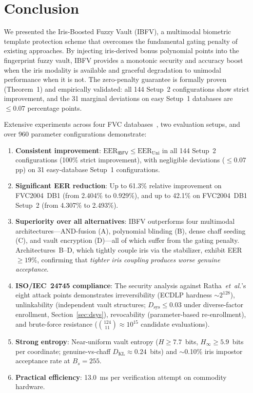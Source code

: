 \documentclass[3p,twocolumn]{elsarticle}
\newcommand{\IBFV}{\textsf{IBFV}}
\newcommand{\EER}{\mathrm{EER}}
\begin{document}
\section{Conclusion}
\label{sec:conclusion}

We presented the Iris-Boosted Fuzzy Vault (\IBFV{}), a multimodal biometric template protection scheme that overcomes the fundamental gating penalty of existing approaches. By injecting iris-derived bonus polynomial points into the fingerprint fuzzy vault, \IBFV{} provides a monotonic security and accuracy boost when the iris modality is available and graceful degradation to unimodal performance when it is not. The zero-penalty guarantee is formally proven (Theorem~1) and empirically validated: all 144 Setup~2 configurations show strict improvement, and the 31 marginal deviations on easy Setup~1 databases are $\leq 0.07$ percentage points.

Extensive experiments across four FVC databases~\cite{maio2002fvc2002,maio2004fvc2004}, two evaluation setups, and over 960 parameter configurations demonstrate:
\begin{enumerate}
    \item \textbf{Consistent improvement}: $\EER_{\IBFV} \leq \EER_{\text{Uni}}$ in all 144 Setup~2 configurations (100\% strict improvement), with negligible deviations ($\leq 0.07$ pp) on 31 easy-database Setup~1 configurations.
    \item \textbf{Significant EER reduction}: Up to 61.3\% relative improvement on FVC2004~DB1 (from 2.404\% to 0.929\%), and up to 42.1\% on FVC2004~DB1 Setup~2 (from 4.307\% to 2.493\%).
    \item \textbf{Superiority over all alternatives}: \IBFV{} outperforms four multimodal architectures---AND-fusion (A), polynomial blinding (B), dense chaff seeding (C), and vault encryption (D)---all of which suffer from the gating penalty. Architectures~B--D, which tightly couple iris via the stabilizer, exhibit EER $\geq 19\%$, confirming that \emph{tighter iris coupling produces worse genuine acceptance}.
    \item \textbf{ISO/IEC~24745 compliance}: The security analysis against Ratha~\textit{et~al.}'s~\cite{ratha2001enhancing} eight attack points demonstrates irreversibility (ECDLP hardness $\sim\!2^{128}$), unlinkability (independent vault structures; $D_{\text{sys}} \leq 0.03$ under diverse-factor enrollment, Section~\ref{sec:dsys}), revocability (parameter-based re-enrollment), and brute-force resistance ($\binom{124}{11} \approx 10^{15}$ candidate evaluations).
    \item \textbf{Strong entropy}: Near-uniform vault entropy ($H \geq 7.7$~bits, $H_\infty \geq 5.9$~bits per coordinate; genuine-vs-chaff $D_{\mathrm{KL}} \approx 0.24$~bits) and $\sim$0.10\% iris impostor acceptance rate at $B_s = 255$.
    \item \textbf{Practical efficiency}: 13.0~ms per verification attempt on commodity hardware.
\end{enumerate}
\end{document}
